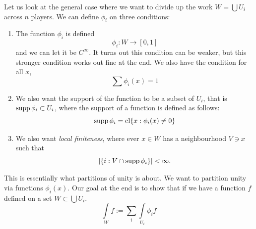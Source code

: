 \documentclass{article}
\numberwithin{equation}{section}
\begin{document}
Let us look at the general case where we want to divide up the work $W= \bigcup U_i$ across $n$ players. We can define $\phi_i$ on three conditions:
\begin{enumerate}
    \item The function $\phi_i$ is defined 
    \begin{equation}
        \phi_i: W \rightarrow [0,1]
    \end{equation}
    and we can let it be $C^\infty$. It turns out this condition can be weaker, but this stronger condition works out fine at the end. We also have the condition for all $x$,
    \begin{equation}
        \sum \phi_i(x) = 1
    \end{equation}
    \item We also want the support of the function to be a subset of $U_i$, that is $\operatorname{supp} \phi_i \subset U_i$, where the support of a function is defined as follows:
    \begin{equation}
        \operatorname{supp} \phi_i = \operatorname{cl} \{x:\phi_i(x) \neq 0\}
    \end{equation}
    \item We also want \textit{local finiteness}, where ever $x\in W$ has a neighbourhood $V \ni x$ such that 
    \begin{equation}
        \left|\{i: V \cap \operatorname{supp} \phi_i \} \right| < \infty.
    \end{equation}
\end{enumerate}
This is essentially what partitions of unity is about. We want to partition unity via functions $\phi_i(x).$ Our goal at the end is to show that if we have a function $f$ defined on a set $W \subset \bigcup U_i.$ 
\begin{equation}
    \int\limits_W f := \sum_i \int\limits_{U_i}\phi_i f
\end{equation}
\end{document}
